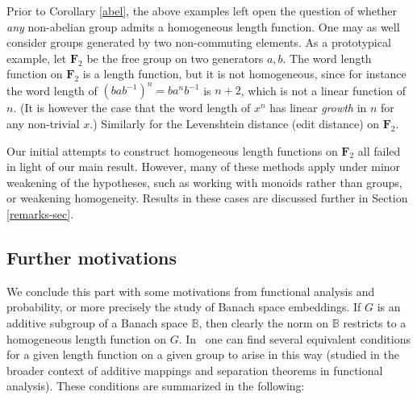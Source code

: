 \documentclass[11pt,a4paper,reqno]{amsart}
\numberwithin{equation}{section}
\theoremstyle{plain}
\theoremstyle{definition}
\newcommand\free[1]{\mathbf{F}_{#1}}
\begin{document}
Prior to Corollary \ref{abel}, the above examples left open the question
of whether \textit{any} non-abelian group admits a homogeneous length
function. One may as well consider groups generated by two non-commuting
elements. As a prototypical example, let $\free{2}$ be the free group on
two generators $a,b$.  The word length function on $\free{2}$ is a length
function, but it is not homogeneous, since for instance the word length
of $(bab^{-1})^n = ba^n b^{-1}$ is $n+2$, which is not a linear function
of $n$.  (It is however the case that the word length of $x^n$ has linear
\emph{growth} in $n$ for any non-trivial $x$.) Similarly for the
Levenshtein distance (edit distance) on $\free{2}$.

Our initial attempts to construct homogeneous length functions on
$\free{2}$ all failed in light of our main result. However, many of these
methods apply under minor weakening of the hypotheses, such as working
with monoids rather than groups, or weakening homogeneity. Results in
these cases are discussed further in Section \ref{remarks-sec}.


\subsection{Further motivations}

We conclude this part with some motivations from functional analysis and
probability, or more precisely the study of Banach space embeddings. If
$G$ is an additive subgroup of a Banach space $\mathbb{B}$, then clearly
the norm on $\mathbb{B}$ restricts to a homogeneous length function on
$G$. In~\cite{CSC,GK} one can find several equivalent conditions for a
given length function on a given group to arise in this way (studied in
the broader context of additive mappings and separation theorems in
functional analysis). These conditions are summarized in the following:
\end{document}
